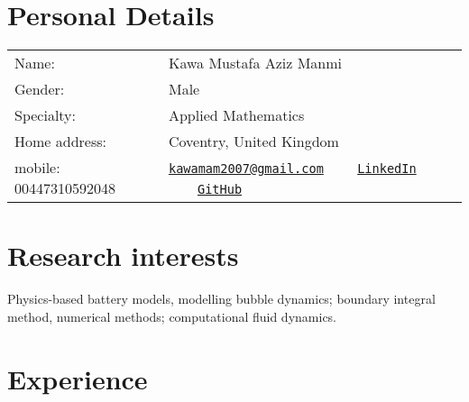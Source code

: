 \documentclass[line]{res}
\newenvironment{p11}
{\begin{adjustwidth}{-25pt}{0pt}
\vspace{8pt}}
{\end{adjustwidth}}
\begin{document}



\begin{resume}


\section{Personal Details}
\begin{tabular}{ll}
Name: & Kawa Mustafa Aziz Manmi \\
Gender: & Male \\
Specialty: & Applied Mathematics \\
Home address: & Coventry, United Kingdom \\
mobile: 00447310592048 & \href{mailto:kawamam2007@gmail.com}{\texttt{kawamam2007@gmail.com}} \ \ \ \  \hfill\href{https://www.linkedin.com/in/kawamanmi/}{\texttt{LinkedIn}}
 \ \ \ \ \hfill\href{https://github.com/kawaMANMI}{\texttt{GitHub}}
\end{tabular}


\section{Research interests}
\begin{p11}
Physics-based battery models, modelling bubble dynamics; boundary integral method, numerical methods; computational fluid dynamics.
\end{p11}


\section{Experience}


\end{resume}
\end{document}
